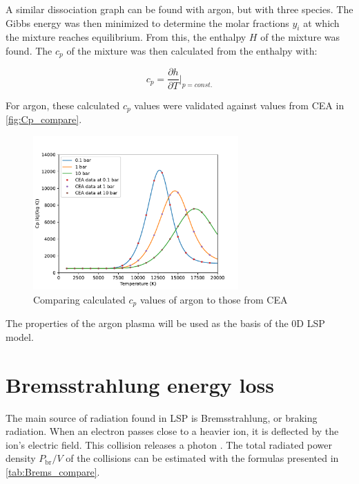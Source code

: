         A similar dissociation graph can be found with argon, but with three species. The Gibbs energy was then minimized to determine the molar fractions $y_i$ at which the mixture reaches equilibrium. From this, the enthalpy $H$ of the mixture was found. The $c_p$ of the mixture was then calculated from the enthalpy with:

        \begin{equation}
            c_p = \frac{\partial h}{\partial T}\bigg|_{p = const.}
        \end{equation}
        
        For argon, these calculated $c_p$ values were validated against values from CEA \cite{CEARUNRev4} in \autoref{fig:Cp_compare}.
        
        \begin{figure}[!ht]
            \centering
            \includegraphics[width=0.7\textwidth]{assets/2 models/Cp_compare.pdf}
            \caption{Comparing calculated $c_p$ values of argon to those from CEA}
            \label{fig:Cp_compare}
        \end{figure}

        The properties of the argon plasma will be used as the basis of the 0D LSP model.
    
    \section{Bremsstrahlung energy loss}
        
        The main source of radiation found in LSP is Bremsstrahlung, or braking radiation. When an electron passes close to a heavier ion, it is deflected by the ion's electric field. This collision releases a photon \autocite{glasstoneControlledThermonuclearReactions1975}. The total radiated power density $P_\mathrm{br}/V$ of the collisions can be estimated with the formulas presented in \autoref{tab:Brems_compare}.

